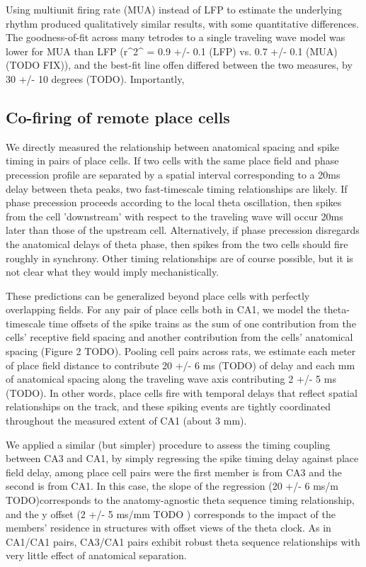\documentclass[10pt]{article}
\begin{document}
Using multiunit firing rate (MUA) instead of LFP to estimate the underlying rhythm produced qualitatively similar results, with some quantitative differences. The goodness-of-fit across many tetrodes to a single traveling wave model was lower for MUA than LFP (r^2^ = 0.9 +/- 0.1 (LFP) vs. 0.7 +/- 0.1 (MUA) (TODO FIX)), and the best-fit line offen differed between the two measures, by 30 +/- 10 degrees (TODO). Importantly, 

\subsection*{Co-firing of remote place cells}
We directly measured the relationship between anatomical spacing and spike timing in pairs of place cells. If two cells with the same place field and phase precession profile are separated by a spatial interval corresponding to a 20ms delay between theta peaks, two fast-timescale timing relationships are likely. If phase precession proceeds according to the local theta oscillation, then spikes from the cell 'downstream' with respect to the traveling wave will occur 20ms later than those of the upstream cell. Alternatively, if phase precession disregards the anatomical delays of theta phase, then spikes from the two cells should fire roughly in synchrony. Other timing relationships are of course possible, but it is not clear what they would imply mechanistically.

These predictions can be generalized beyond place cells with perfectly overlapping fields. For any pair of place cells both in CA1, we model the theta-timescale time offsets of the spike trains as the sum of one contribution from the cells' receptive field spacing and another contribution from the cells' anatomical spacing (Figure 2 TODO). Pooling cell pairs across rats, we estimate each meter of place field distance to contribute 20 +/- 6 ms (TODO) of delay and each mm of anatomical spacing along the traveling wave axis contributing 2 +/- 5 ms (TODO). In other words, place cells fire with temporal delays that reflect spatial relationships on the track, and these spiking events are tightly coordinated throughout the measured extent of CA1 (about 3 mm).

We applied a similar (but simpler) procedure to assess the timing coupling between CA3 and CA1, by simply regressing the spike timing delay against place field delay, among place cell pairs were the first member is from CA3 and the second is from CA1. In this case, the slope of the regression (20 +/- 6 ms/m TODO)corresponds to the anatomy-agnostic theta sequence timing relationship, and the y offset (2 +/- 5 ms/mm TODO ) corresponds to the impact of the members' residence in structures with offset views of the theta clock. As in CA1/CA1 pairs, CA3/CA1 pairs exhibit robust theta sequence relationships with very little effect of anatomical separation.
\end{document}
